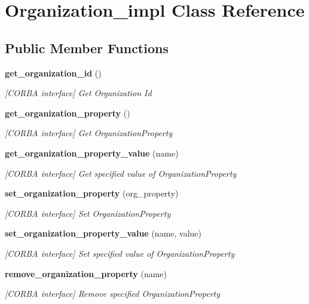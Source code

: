 \section{Organization\_\-impl Class Reference}
\label{classOrganization__impl}
\subsection*{Public Member Functions}
\begin{CompactItemize}
\item 
{\bf get\_\-organization\_\-id} ()
\begin{CompactList}\small\item\em [CORBA interface] Get Organization Id \item\end{CompactList}\item 
{\bf get\_\-organization\_\-property} ()
\begin{CompactList}\small\item\em [CORBA interface] Get Organization\-Property \item\end{CompactList}\item 
{\bf get\_\-organization\_\-property\_\-value} (name)
\begin{CompactList}\small\item\em [CORBA interface] Get specified value of Organization\-Property \item\end{CompactList}\item 
{\bf set\_\-organization\_\-property} (org\_\-property)
\begin{CompactList}\small\item\em [CORBA interface] Set Organization\-Property \item\end{CompactList}\item 
{\bf set\_\-organization\_\-property\_\-value} (name, value)
\begin{CompactList}\small\item\em [CORBA interface] Set specified value of Organization\-Property \item\end{CompactList}\item 
{\bf remove\_\-organization\_\-property} (name)
\begin{CompactList}\small\item\em [CORBA interface] Remove specified Organization\-Property \item\end{CompactList}\item 

\end{CompactItemize}
